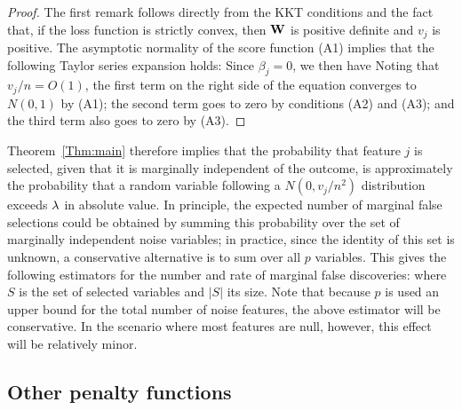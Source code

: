 \begin{proof}
  The first remark follows directly from the KKT conditions and the fact that, if the loss function is strictly convex, then $\mathbf{W}$ is positive definite and $v_j$ is positive.  The asymptotic normality of the score function (A1) implies that the following Taylor series expansion holds:
Since $\beta_j=0$, we then have
Noting that $v_j/n=O(1)$, the first term on the right side of the equation converges to $N(0,1)$ by (A1); the second term goes to zero by conditions (A2) and (A3); and the third term also goes to zero by (A3).
\end{proof}

Theorem~\ref{Thm:main} therefore implies that the probability that feature $j$ is selected, given that it is marginally independent of the outcome, is approximately the probability that a random variable following a $N(0, v_j/n^2)$ distribution exceeds $\lambda$ in absolute value.
In principle, the expected number of marginal false selections could be obtained by summing this probability over the set of marginally independent noise variables; in practice, since the identity of this set is unknown, a conservative alternative is to sum over all $p$ variables.
This gives the following estimators for the number and rate of marginal false discoveries:
where $S$ is the set of selected variables and $|S|$ its size.  Note that because $p$ is used an upper bound for the total number of noise features, the above estimator will be conservative.  In the scenario where most features are null, however, this effect will be relatively minor.

\subsection{Other penalty functions}

